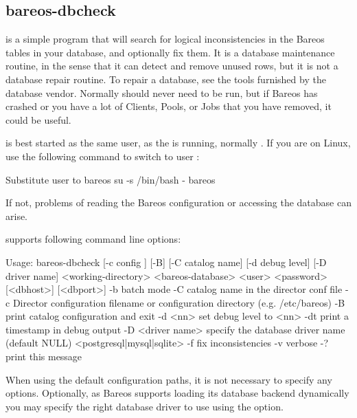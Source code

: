 \subsection{bareos-dbcheck}
    \label{bareos-dbcheck}
    \label{dbcheck}


 is a simple program that will search for logical
inconsistencies in the Bareos tables in your database, and optionally fix them.
It is a database maintenance routine, in the sense that it can
detect and remove unused rows, but it is not a database repair
routine. To repair a database, see the tools furnished by the
database vendor.  Normally  should never need to be run,
but if Bareos has crashed or you have a lot of Clients, Pools, or
Jobs that you have removed, it could be useful.


 is best started as the same user, as the \bareosDir is running, normally .
If you are  on Linux, use the following command to switch to user :
\begin{commands}{Substitute user to bareos}
su -s /bin/bash - bareos
\end{commands}

If not, problems of reading the Bareos configuration or accessing the database can arise.

 supports following command line options:
\begin{commands}{}
Usage: bareos-dbcheck [-c config ] [-B] [-C catalog name] [-d debug level] [-D driver name] <working-directory> <bareos-database> <user> <password> [<dbhost>] [<dbport>]
       -b                batch mode
       -C                catalog name in the director conf file
       -c                Director configuration filename or configuration directory (e.g. /etc/bareos)
       -B                print catalog configuration and exit
       -d <nn>           set debug level to <nn>
       -dt               print a timestamp in debug output
       -D <driver name>  specify the database driver name (default NULL) <postgresql|mysql|sqlite>
       -f                fix inconsistencies
       -v                verbose
       -?                print this message
\end{commands}

When using the default configuration paths, it is not necessary to specify any
options.
Optionally, as Bareos supports loading its database backend dynamically you may specify
the right database driver to use using the  option.

